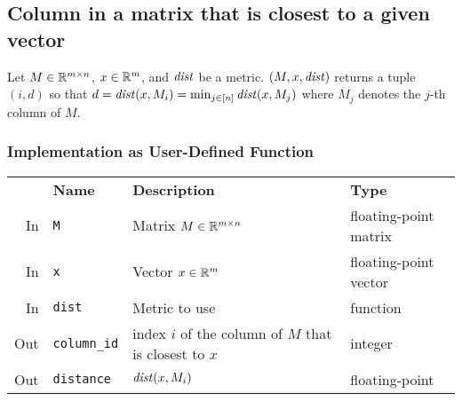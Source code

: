 \subsection{Column in a matrix that is closest to a given vector} \label{sec:matrix:closestColumn}

Let $M \in \mathbb{R}^{m \times n}$, $x \in \mathbb{R}^m$, and $\mathit{dist}$ be a metric. $(M, x, \mathit{dist})$ returns a tuple $(i,d)$ so that $d = \dist(x, M_i) = \min_{j \in \Nupto n} \dist(x, M_j)$ where $M_j$ denotes the $j$-th column of $M$.

\subsubsection{Implementation as User-Defined Function}

\begin{center}
	\begin{tabular}{rlll}
		\toprule%
		& \textbf{Name} & \textbf{Description} & \textbf{Type}
		\\\otoprule
		In &
		\texttt{M} &
		Matrix $M \in \mathbb{R}^{m \times n}$ &
		floating-point matrix
		\\\midrule
		In &
		\texttt{x} &
		Vector $x \in \mathbb{R}^m$ &
		floating-point vector
		\\\midrule
		In &
		\texttt{dist} &
		Metric to use &
		function
		\\\midrule
		Out &
		\texttt{column\_id} &
		index $i$ of the column of $M$ that is closest to $x$ &
		integer
		\\\midrule
		Out &
		\texttt{distance} &
		$\mathit{dist}(x, M_i)$ &
		floating-point
		\\\bottomrule
	\end{tabular}
\end{center}
